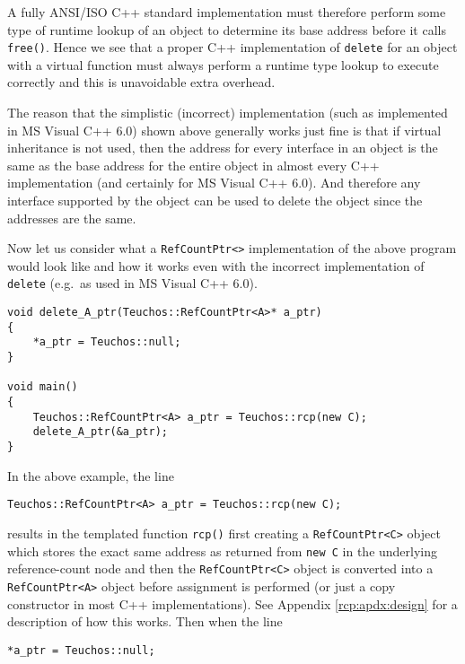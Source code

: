 A fully ANSI/ISO C++ standard implementation must therefore perform
some type of runtime lookup of an object to determine its base address
before it calls {}\texttt{free()}.  Hence we see that a proper C++
implementation of {}\texttt{delete} for an object with a virtual
function must always perform a runtime type lookup to execute
correctly and this is unavoidable extra overhead.

The reason that the simplistic (incorrect) implementation (such as
implemented in MS Visual C++ 6.0) shown above generally works just
fine is that if virtual inheritance is not used, then the address for
every interface in an object is the same as the base address for the
entire object in almost every C++ implementation (and certainly for MS
Visual C++ 6.0).  And therefore any interface supported by the object
can be used to delete the object since the addresses are the same.

Now let us consider what a {}\texttt{RefCountPtr<>} implementation of
the above program would look like and how it works even with the
incorrect implementation of {}\texttt{delete} (e.g.~as used in MS Visual
C++ 6.0).

{\small\begin{verbatim}
void delete_A_ptr(Teuchos::RefCountPtr<A>* a_ptr)
{
    *a_ptr = Teuchos::null;
}

void main()
{
    Teuchos::RefCountPtr<A> a_ptr = Teuchos::rcp(new C);
    delete_A_ptr(&a_ptr);
}
\end{verbatim}}

In the above example, the line

{\small\begin{verbatim}
Teuchos::RefCountPtr<A> a_ptr = Teuchos::rcp(new C);
\end{verbatim}}

{}\noindent{}results in the templated function {}\texttt{rcp()} first
creating a {}\texttt{RefCountPtr<C>} object which stores the exact
same address as returned from {}\texttt{new C} in the underlying
reference-count node and then the {}\texttt{RefCountPtr<C>} object is
converted into a {}\texttt{RefCountPtr<A>} object before assignment is
performed (or just a copy constructor in most C++ implementations).
See Appendix {}\ref{rcp:apdx:design} for a description of how this
works.  Then when the line

{\small\begin{verbatim}
*a_ptr = Teuchos::null;
\end{verbatim}}

